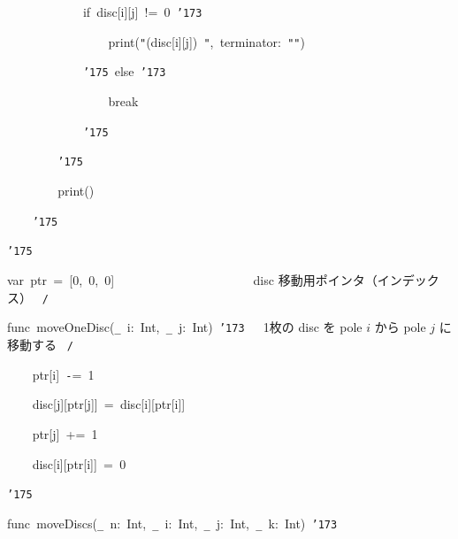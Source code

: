 \documentclass{article}
\begin{document}
\noindent
\mbox{}{\tt\mc \ \ \ \ \ \ \ \ \ \ \ \ }if{\tt\mc \ }disc[i][j]{\tt\mc \ }!={\tt\mc \ }0{\tt\mc \ }{\tt\char'173}

\noindent
\mbox{}{\tt\mc \ \ \ \ \ \ \ \ \ \ \ \ \ \ \ \ }print({\tt "}{\tt{}}(disc[i][j]){\tt\mc \ }{\tt "},{\tt\mc \ }terminator:{\tt\mc \ }{\tt "}{\tt "})

\noindent
\mbox{}{\tt\mc \ \ \ \ \ \ \ \ \ \ \ \ }{\tt\char'175}{\tt\mc \ }else{\tt\mc \ }{\tt\char'173}

\noindent
\mbox{}{\tt\mc \ \ \ \ \ \ \ \ \ \ \ \ \ \ \ \ }break

\noindent
\mbox{}{\tt\mc \ \ \ \ \ \ \ \ \ \ \ \ }{\tt\char'175}

\noindent
\mbox{}{\tt\mc \ \ \ \ \ \ \ \ }{\tt\char'175}

\noindent
\mbox{}{\tt\mc \ \ \ \ \ \ \ \ }print()

\noindent
\mbox{}{\tt\mc \ \ \ \ }{\tt\char'175}

\noindent
\mbox{}{\tt\char'175}

\noindent
\mbox{}\hfill

\noindent
\mbox{}var{\tt\mc \ }ptr{\tt\mc \ }={\tt\mc \ }[0,{\tt\mc \ }0,{\tt\mc \ }0]{\tt\mc \ \ \ \ \ }{\tt\mc \ \ \ \ \ \ \ \ }{\tt\mc \ \ \ \ \ \ \ \ }\rm\mc {\tt /}{\tt *}\  {}disc 移動用ポインタ（インデックス）
					   \hfill \rm\mc \ {\tt *}{\tt /}
\tt\mc 

\noindent
\mbox{}\hfill

\noindent
\mbox{}func{\tt\mc \ }moveOneDisc({\tt\_}{\tt\mc \ }i:{\tt\mc \ }Int,{\tt\mc \ }{\tt\_}{\tt\mc \ }j:{\tt\mc \ }Int){\tt\mc \ }{\tt\char'173}{\tt\mc \ \ }\rm\mc {\tt /}{\tt *}\  {}1枚の disc を pole $i$ から
					   pole $j$ に移動する \hfill \rm\mc \ {\tt *}{\tt /}
\tt\mc 

\noindent
\mbox{}{\tt\mc \ \ \ \ }ptr[i]{\tt\mc \ }{\tt -}={\tt\mc \ }1

\noindent
\mbox{}{\tt\mc \ \ \ \ }disc[j][ptr[j]]{\tt\mc \ }={\tt\mc \ }disc[i][ptr[i]]

\noindent
\mbox{}{\tt\mc \ \ \ \ }ptr[j]{\tt\mc \ }+={\tt\mc \ }1

\noindent
\mbox{}{\tt\mc \ \ \ \ }disc[i][ptr[i]]{\tt\mc \ }={\tt\mc \ }0

\noindent
\mbox{}{\tt\char'175}

\noindent
\mbox{}\hfill

\noindent
\mbox{}func{\tt\mc \ }moveDiscs({\tt\_}{\tt\mc \ }n:{\tt\mc \ }Int,{\tt\mc \ }{\tt\_}{\tt\mc \ }i:{\tt\mc \ }Int,{\tt\mc \ }{\tt\_}{\tt\mc \ }j:{\tt\mc \ }Int,{\tt\mc \ }{\tt\_}{\tt\mc \ }k:{\tt\mc \ }Int){\tt\mc \ }{\tt\char'173}
\end{document}
